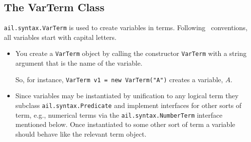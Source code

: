 \subsection{The VarTerm Class}
\texttt{ail.syntax.VarTerm} is used to create variables in terms.  Following \prolog\ conventions, all variables start with capital letters.
\begin{itemize}
\item You create a \texttt{VarTerm} object by calling the constructor \texttt{VarTerm} with a string argument that is the name of the variable.

So, for instance, \texttt{VarTerm v1 = new VarTerm("A")} creates a variable, $A$.
\item Since variables may be instantiated by unification to any logical term they subclass \texttt{ail.syntax.Predicate} and implement interfaces for other sorts of term, e.g., numerical terms via the \texttt{ail.syntax.NumberTerm} interface mentioned below.  Once instantiated to some other sort of term a variable should behave like the relevant term object.
\end{itemize}

